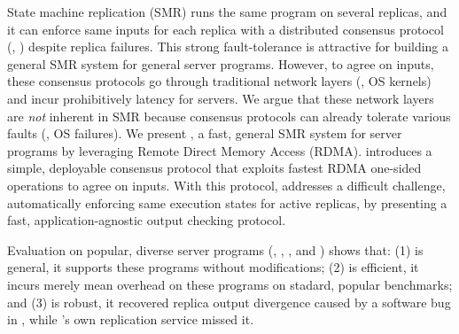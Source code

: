 

State machine replication (SMR) runs the same program on several replicas, and 
it can enforce same inputs for each replica with a distributed consensus 
protocol (\eg, \paxos) despite replica failures. This strong fault-tolerance is 
attractive for building a general SMR system for general server programs. 
However, to agree on inputs, these consensus protocols go through 
traditional network layers (\eg, OS kernels) and incur prohibitively latency 
for servers. We argue that these network layers are \emph{not} inherent in SMR 
because consensus protocols can already tolerate various faults (\eg, OS 
failures). We present \xxx, a fast, general SMR system for server programs by 
leveraging Remote Direct Memory Access (RDMA). \xxx introduces a simple, 
deployable consensus protocol that exploits fastest RDMA one-sided operations to 
agree on inputs. With this protocol, \xxx addresses a difficult challenge, 
automatically enforcing same execution states for active replicas, by presenting 
a fast, application-agnostic output checking protocol.

Evaluation on \nprog popular, diverse server programs (\eg, \memcached, \mysql, 
and \clamav) shows that: (1) \xxx is general, it supports these programs 
without modifications; (2) \xxx is efficient, it incurs merely \overhead mean 
overhead on these programs on stadard, popular benchmarks; and (3) \xxx is 
robust, it recovered replica output divergence caused by a software bug in 
\redis, while \redis's own replication service missed it.


